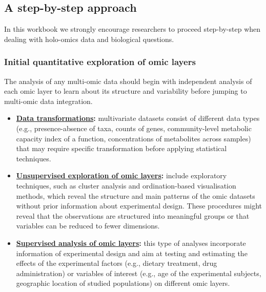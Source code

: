 \documentclass[
]{book}
\providecommand{\tightlist}{%
  \setlength{\itemsep}{0pt}\setlength{\parskip}{0pt}}
\begin{document}
\hypertarget{a-step-by-step-approach}{%
\subsection*{A step-by-step approach}\label{a-step-by-step-approach}}

In this workbook we strongly encourage researchers to proceed step-by-step when dealing with holo-omics data and biological questions.

\hypertarget{initial-quantitative-exploration-of-omic-layers}{%
\subsubsection*{Initial quantitative exploration of omic layers}\label{initial-quantitative-exploration-of-omic-layers}}

The analysis of any multi-omic data should begin with independent analysis of each omic layer to learn about its structure and variability before jumping to multi-omic data integration.

\begin{itemize}
\tightlist
\item
  \textbf{\protect\hyperlink{data-transformations}{Data transformations}:} multivariate datasets consist of different data types (e.g., presence-absence of taxa, counts of genes, community-level metabolic capacity index of a function, concentrations of metabolites across samples) that may require specific transformation before applying statistical techniques.
\item
  \textbf{\protect\hyperlink{unsupervised-exploration}{Unsupervised exploration of omic layers}:} include exploratory techniques, such as cluster analysis and ordination-based visualisation methods, which reveal the structure and main patterns of the omic datasets without prior information about experimental design. These procedures might reveal that the observations are structured into meaningful groups or that variables can be reduced to fewer dimensions.
\item
  \textbf{\protect\hyperlink{supervised-analysis}{Supervised analysis of omic layers}:} this type of analyses incorporate information of experimental design and aim at testing and estimating the effects of the experimental factors (e.g., dietary treatment, drug administration) or variables of interest (e.g., age of the experimental subjects, geographic location of studied populations) on different omic layers.
\end{itemize}
\end{document}
